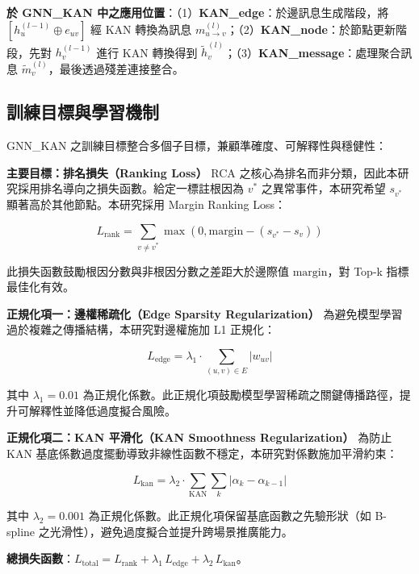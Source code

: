 \documentclass[10pt,a4paper,twocolumn]{article}
\begin{document}
\textbf{於 GNN\_KAN 中之應用位置}：（1）\textbf{KAN\_edge}：於邊訊息生成階段，將 $[h_u^{(l-1)} \oplus e_{uv}]$ 經 KAN 轉換為訊息 $m_{u \to v}^{(l)}$；（2）\textbf{KAN\_node}：於節點更新階段，先對 $h_v^{(l-1)}$ 進行 KAN 轉換得到 $\tilde{h}_v^{(l)}$；（3）\textbf{KAN\_message}：處理聚合訊息 $\tilde{m}_v^{(l)}$，最後透過殘差連接整合。

\subsection{訓練目標與學習機制}

GNN\_KAN 之訓練目標整合多個子目標，兼顧準確度、可解釋性與穩健性：

\textbf{主要目標：排名損失（Ranking Loss）}  
RCA 之核心為排名而非分類，因此本研究採用排名導向之損失函數。給定一標註根因為 $v^*$ 之異常事件，本研究希望 $s_{v^*}$ 顯著高於其他節點。本研究採用 Margin Ranking Loss：

\begin{equation}
L_{\text{rank}} = \sum_{v \neq v^*} \max(0, \text{margin} - (s_{v^*} - s_v))
\end{equation}

此損失函數鼓勵根因分數與非根因分數之差距大於邊際值 $\text{margin}$，對 Top-k 指標最佳化有效。

\textbf{正規化項一：邊權稀疏化（Edge Sparsity Regularization）}  
為避免模型學習過於複雜之傳播結構，本研究對邊權施加 L1 正規化：

\begin{equation}
L_{\text{edge}} = \lambda_1 \cdot \sum_{(u,v)\in E} |w_{uv}|
\end{equation}

其中 $\lambda_1=0.01$ 為正規化係數。此正規化項鼓勵模型學習稀疏之關鍵傳播路徑，提升可解釋性並降低過度擬合風險。

\textbf{正規化項二：KAN 平滑化（KAN Smoothness Regularization）}  
為防止 KAN 基底係數過度擺動導致非線性函數不穩定，本研究對係數施加平滑約束：

\begin{equation}
L_{\text{kan}} = \lambda_2 \cdot \sum_{\text{KAN}} \sum_k |\alpha_k - \alpha_{k-1}|
\end{equation}

其中 $\lambda_2=0.001$ 為正規化係數。此正規化項保留基底函數之先驗形狀（如 B-spline 之光滑性），避免過度擬合並提升跨場景推廣能力。

\textbf{總損失函數}：$L_{\text{total}} = L_{\text{rank}} + \lambda_1 \, L_{\text{edge}} + \lambda_2 \, L_{\text{kan}}$。
\end{document}

